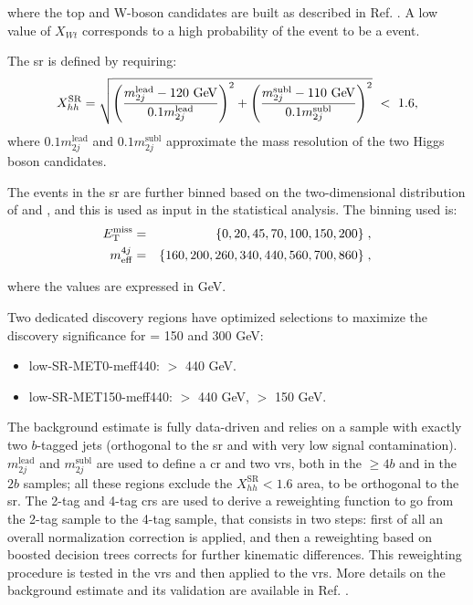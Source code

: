 \noindent where the top and W-boson candidates are built as described in Ref. \cite{Aaboud:2018htj}. 
A low value of $X_{Wt}$ corresponds to a high probability of the event to be a \ttbar event. 

The \gls{sr} is defined by requiring: 
\begin{equation}
X_{hh}^\textrm{SR} = \sqrt{ \left( \frac{m_{2j}^\textrm{lead} - 120\ \text{Ge\kern -0.1em V}}{0.1 m_{2j}^\textrm{lead}} \right)^2 + \left( \frac{m_{2j}^\textrm{subl} - 110\ \text{Ge\kern -0.1em V}}{0.1 m_{2j}^\textrm{subl}} \right)^2} \ <\ 1.6,
\end{equation}
\noindent where $0.1  m_{2j}^\textrm{lead}$ and $0.1 m_{2j}^\textrm{subl}$ approximate the mass resolution of the two Higgs 
boson candidates. 

The events in the \gls{sr} are further binned based on the two-dimensional distribution of \met and \meff, 
and this is used as input in the statistical analysis. The binning used is:
\begin{eqnarray*} 
E_{\rm T}^{\mathrm{miss}} &=& \{0, 20, 45, 70, 100, 150, 200\} \;, \\
m_{\mathrm{eff}}^{4j} &=&\{160, 200, 260, 340, 440, 560, 700, 860\} \;,
\end{eqnarray*}

\noindent where the values are expressed in GeV.

Two dedicated discovery regions have optimized selections to maximize the discovery significance for \mhino = 150 and 300 GeV:
\begin{itemize}
\item low-SR-MET0-meff440: \meffb $>$ 440 GeV.
\item low-SR-MET150-meff440: \meffb $>$ 440 GeV, \met $>$ 150 GeV.
\end{itemize}

The background estimate is fully data-driven and relies on a sample with exactly two $b$-tagged jets (orthogonal to the \gls{sr} and 
with very low signal contamination). $m_{2j}^\textrm{lead}$ and $m_{2j}^\textrm{subl}$ are used to define a \gls{cr} and two \glspl{vr}, both in the $\geq4b$ and in the $2b$ samples; all these regions exclude the $X_{hh}^\textrm{SR}<1.6$ area, to be orthogonal to the \gls{sr}.
The 2-tag and 4-tag \glspl{cr} are used to derive a reweighting function to go from the 2-tag sample to the 4-tag sample, that consists in two steps:
first of all an overall normalization correction is applied, and then 
a reweighting based on boosted decision trees corrects for further kinematic differences. 
This reweighting procedure is tested in the \glspl{vr} and then applied to the \glspl{vr}.
More details on the background estimate and its validation are available in Ref. \cite{Aaboud:2018htj}.

